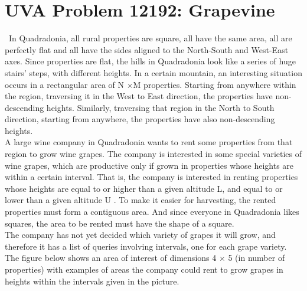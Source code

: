 \documentclass[12pt]{article}
\begin{document}
\section{UVA Problem 12192: Grapevine}
~\indent In Quadradonia, all rural properties are square, all have the same area, all are perfectly flat and all
have the sides aligned to the North-South and West-East axes.
Since properties are flat, the hills in Quadradonia look like a series of huge stairs’ steps, with different
heights. In a certain mountain, an interesting situation occurs in a rectangular area of N ×M properties.
Starting from anywhere within the region, traversing it in the West to East direction, the properties
have non-descending heights. Similarly, traversing that region in the North to South direction, starting
from anywhere, the properties have also non-descending heights. \\
\indent A large wine company in Quadradonia wants to rent some properties from that region to grow wine
grapes. The company is interested in some special varieties of wine grapes, which are productive only
if grown in properties whose heights are within a certain interval. That is, the company is interested in
renting properties whose heights are equal to or higher than a given altitude L, and equal to or lower
than a given altitude U . To make it easier for harvesting, the rented properties must form a contiguous
area. And since everyone in Quadradonia likes squares, the area to be rented must have the shape of
a square. \\
\indent The company has not yet decided which variety of grapes it will grow, and therefore it has a list
of queries involving intervals, one for each grape variety. The figure below shows an area of interest
of dimensions 4 × 5 (in number of properties) with examples of areas the company could rent to grow
grapes in heights within the intervals given in the picture.

\begin{figure}[H]
    \centering
\end{figure}
\end{document}

